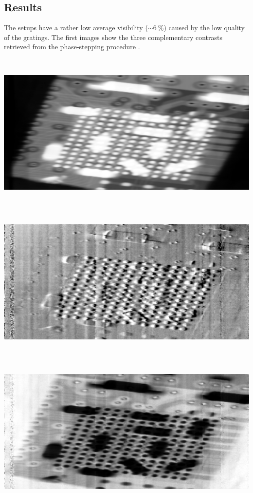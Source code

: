 \documentclass[a0,portrait]{a0poster}
\newenvironment{spacedcenter}{\vspace{2cm}\begin{center}}
        {\end{center}\vspace{2cm}\par}
\begin{document}
\begin{multicols}{2}
\section*{Results}
The setups have a rather low average
visibility ($\sim\SI{6}{\percent}$) caused by the low quality of the
gratings. The first images show the three complementary contrasts retrieved
from the phase-stepping procedure \cite{Weitkamp2005}. 
\begin{spacedcenter}
    \includegraphics[width=0.3\linewidth,height=8cm]{images_S00075_S00071-img0.png}
    \includegraphics[width=0.3\linewidth,height=8cm]{images_S00075_S00071-img1.png}
    \includegraphics[width=0.3\linewidth,height=8cm]{images_S00075_S00071-img2.png}

\end{spacedcenter}
\end{multicols}
\end{document}
